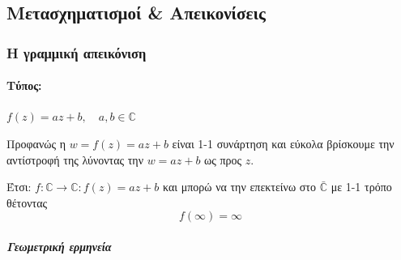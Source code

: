 \documentclass[12pt,a4paper,notitlepage,fleqn]{article}
\begin{document}
    \subsection{Μετασχηματισμοί \& Απεικονίσεις}
    \subsubsection{Η γραμμική απεικόνιση}
    \paragraph{Τύπος:} \( f(z) = az+b,\quad a,b\in\mathbb C  \)

    Προφανώς η \( w = f(z)=az+b \) είναι 1-1 συνάρτηση και εύκολα βρίσκουμε την
    αντίστροφή της λύνοντας την \( w=az+b \) ως προς \( z \).

    Έτσι: \( f: \mathbb C \to \mathbb C : f(z)=az+b \) και μπορώ να την επεκτείνω
    στο \( \bar{\mathbb C}  \) με 1-1 τρόπο θέτοντας \[
    f(\infty) = \infty
    \]

    \subparagraph{Γεωμετρική ερμηνεία}
    \hspace{0pt}
\end{document}
